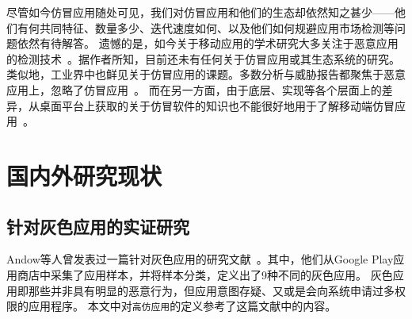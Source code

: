 尽管如今仿冒应用随处可见，我们对仿冒应用和他们的生态却依然知之甚少——他们有何共同特征、数量多少、迭代速度如何、以及他们如何规避应用市场检测等问题依然有待解答。
遗憾的是，如今关于移动应用的学术研究大多关注于恶意应用的检测技术~\cite{chen2016stormdroid,chen2018automated, chen2016towards, fan2016poster}。据作者所知，目前还未有任何关于仿冒应用或其生态系统的研究。
类似地，工业界中也鲜见关于仿冒应用的课题。多数分析与威胁报告都聚焦于恶意应用上，忽略了仿冒应用~\cite{McAfee_mobile_thread_report}。
而在另一方面，由于底层、实现等各个层面上的差异，从桌面平台上获取的关于仿冒软件的知识也不能很好地用于了解移动端仿冒应用~\cite{yin2007panorama}。

\section{国内外研究现状}
\subsection{针对灰色应用的实证研究}

Andow等人曾发表过一篇针对灰色应用的研究文献~\cite{Andow2016ASO}。其中，他们从Google Play应用商店中采集了应用样本，并将样本分类，定义出了9种不同的灰色应用。
灰色应用即那些并非具有明显的恶意行为，但应用意图存疑、又或是会向系统申请过多权限的应用程序。
本文中对\texttt{高仿应用}的定义参考了这篇文献中的内容。

